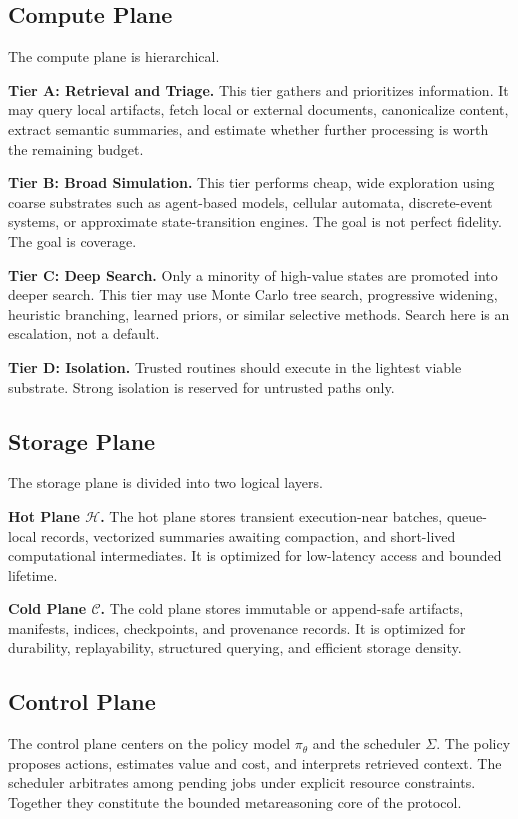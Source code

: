 \documentclass[11pt]{article}
\theoremstyle{definition}
\newcommand{\hot}{\mathcal{H}}
\newcommand{\cold}{\mathcal{C}}
\begin{document}
\subsection{Compute Plane}

The compute plane is hierarchical.

\textbf{Tier A: Retrieval and Triage.}  
This tier gathers and prioritizes information. It may query local artifacts, fetch local or external documents, canonicalize content, extract semantic summaries, and estimate whether further processing is worth the remaining budget.

\textbf{Tier B: Broad Simulation.}  
This tier performs cheap, wide exploration using coarse substrates such as agent-based models, cellular automata, discrete-event systems, or approximate state-transition engines. The goal is not perfect fidelity. The goal is coverage.

\textbf{Tier C: Deep Search.}  
Only a minority of high-value states are promoted into deeper search. This tier may use Monte Carlo tree search, progressive widening, heuristic branching, learned priors, or similar selective methods. Search here is an escalation, not a default.

\textbf{Tier D: Isolation.}  
Trusted routines should execute in the lightest viable substrate. Strong isolation is reserved for untrusted paths only.

\subsection{Storage Plane}

The storage plane is divided into two logical layers.

\textbf{Hot Plane \(\hot\).}  
The hot plane stores transient execution-near batches, queue-local records, vectorized summaries awaiting compaction, and short-lived computational intermediates. It is optimized for low-latency access and bounded lifetime.

\textbf{Cold Plane \(\cold\).}  
The cold plane stores immutable or append-safe artifacts, manifests, indices, checkpoints, and provenance records. It is optimized for durability, replayability, structured querying, and efficient storage density.

\subsection{Control Plane}

The control plane centers on the policy model \(\pi_\theta\) and the scheduler \(\Sigma\). The policy proposes actions, estimates value and cost, and interprets retrieved context. The scheduler arbitrates among pending jobs under explicit resource constraints. Together they constitute the bounded metareasoning core of the protocol.
\end{document}

